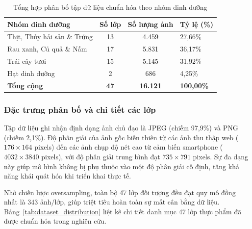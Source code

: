 \begin{table}[htbp]
\centering
\caption{Tổng hợp phân bố tập dữ liệu chuẩn hóa theo nhóm dinh dưỡng}
\label{tab:dataset_categories_summary}
\small
\renewcommand{\arraystretch}{1.2}
\begin{tabularx}{\textwidth}{|p{5.5cm}|c|c|X|}
\hline
\textbf{Nhóm dinh dưỡng} & \textbf{Số lớp} & \textbf{Số lượng ảnh} & \textbf{Tỷ lệ (\%)} \\
\hline
Thịt, Thủy hải sản \& Trứng & 13 & 4.459 & 27,66\% \\
Rau xanh, Củ quả \& Nấm & 17 & 5.831 & 36,17\% \\
Trái cây tươi & 15 & 5.145 & 31,92\% \\
Hạt dinh dưỡng & 2 & 686 & 4,25\% \\
\hline
\textbf{Tổng cộng} & \textbf{47} & \textbf{16.121} & \textbf{100,00\%} \\
\hline
\end{tabularx}
\end{table}

\subsubsection{Đặc trưng phân bố và chi tiết các lớp}
Tập dữ liệu ghi nhận định dạng ảnh chủ đạo là JPEG (chiếm 97,9\%) và PNG (chiếm 2,1\%). Độ phân giải của ảnh gốc biến thiên từ các ảnh thu thập web ($176 \times 164$ pixels) đến các ảnh chụp độ nét cao từ cảm biến smartphone ($4032 \times 3840$ pixels), với độ phân giải trung bình đạt $735 \times 791$ pixels. Sự đa dạng này giúp mô hình không bị phụ thuộc vào một độ phân giải cố định, tăng khả năng khái quát hóa khi triển khai thực tế.

Nhờ chiến lược oversampling, toàn bộ 47 lớp đối tượng đều đạt quy mô đồng nhất là $343$ ảnh/lớp, giúp triệt tiêu hoàn toàn sự mất cân bằng dữ liệu. Bảng~\ref{tab:dataset_distribution} liệt kê chi tiết danh mục 47 lớp thực phẩm đã được chuẩn hóa trong nghiên cứu.

